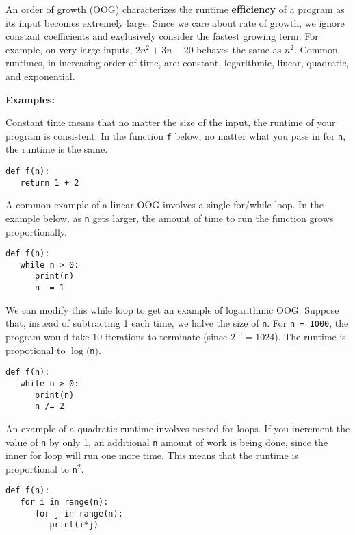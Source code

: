 An order of growth (OOG) characterizes the runtime \textbf{efficiency} of a program as its input becomes extremely large. Since we care about rate of growth, we ignore constant coefficients and exclusively consider the fastest growing term. For example, on very large inputs, $2n^2 + 3n - 20$ behaves the same as $n^2$. Common runtimes, in increasing order of time, are: constant, logarithmic, linear, quadratic, and exponential.

\textbf{Examples:}

Constant time means that no matter the size of the input, the runtime of your program is consistent. In the function \lstinline{f} below, no matter what you pass in for \lstinline{n}, the runtime is the same. \\
\begin{lstlisting}
def f(n):
   return 1 + 2
\end{lstlisting}
A common example of a linear OOG involves a single for/while loop. In the example below, as \lstinline{n} gets larger, the amount of time to run the function grows proportionally. \\
\begin{lstlisting}
def f(n):
   while n > 0:
      print(n)
      n -= 1
\end{lstlisting}
We can modify this while loop to get an example of logarithmic OOG. Suppose that, instead of subtracting 1 each time, we halve the size of \lstinline{n}. For \lstinline{n = 1000}, the program would take 10 iterations to terminate (since $2^10 = 1024$). The runtime is propotional to $\log($\lstinline{n}$)$.
\begin{lstlisting}
def f(n):
   while n > 0:
      print(n)
      n /= 2
\end{lstlisting}
An example of a quadratic runtime involves nested for loops. If you increment the value of \lstinline{n} by only 1, an additional \lstinline{n} amount of work is being done, since the inner for loop will run one more time. This means that the runtime is proportional to \lstinline{n}$^{2}$. \\
\begin{lstlisting}
def f(n):
   for i in range(n):
      for j in range(n):
         print(i*j)
\end{lstlisting}

